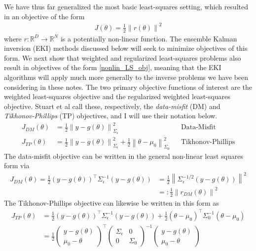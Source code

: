 \documentclass[12pt]{article}
\newcommand*{\norm}[1]{\left\lVert#1\right\rVert}
\newcommand{\R}{\mathbb{R}}
\begin{document}
We have thus far generalized the most basic least-squares setting, which resulted in an objective of the form
\begin{align}
J(\theta) = \frac{1}{2} \norm{r(\theta)}^2 \label{nonlin_LS_obj}
\end{align}
where $r: \R^D \to \R^N$ is a potentially non-linear function. The ensemble Kalman inversion (EKI) methods discussed below will seek to minimize objectives of this form. 
We next show that weighted and regularized least-squares problems also result in objectives of the form \ref{nonlin_LS_obj}, meaning that the EKI algorithms will apply much more 
generally to the inverse problems we have been considering in these notes. The two primary objective functions of interest are the weighted least-squares objective and the regularized 
weighted least-squares objective. Stuart et al call these, respectively, the \textit{data-misfit} (DM) and \textit{Tikhonov-Phillips} (TP) objectives, and I will use their notation below. 
\begin{align}
J_{DM}(\theta) &= \frac{1}{2} \norm{y - g(\theta)}^2_{\Sigma_{\epsilon}} && \text{Data-Misfit} \\
J_{TP}(\theta) &= \frac{1}{2} \norm{y - g(\theta)}^2_{\Sigma_{\epsilon}} + \frac{1}{2} \norm{\theta - \mu_0}^2_{\Sigma_0} && \text{Tikhonov-Phillips} 
\end{align}
The data-misfit objective can be written in the general non-linear least squares form via
\begin{align*}
J_{DM}(\theta) = \frac{1}{2} (y - g(\theta))^\top \Sigma^{-1}_{\epsilon} (y - g(\theta)) &= \frac{1}{2} \norm{\Sigma_{\epsilon}^{-1/2}(y - g(\theta))}^2 \\
																						&=: \frac{1}{2} \norm{r_{DM}(\theta)}^2
\end{align*}
The Tikhonov-Phillips objective can likewise be written in this form as
\begin{align*}
J_{TP}(\theta) &= \frac{1}{2} (y - g(\theta))^\top \Sigma^{-1}_{\epsilon} (y - g(\theta)) + \frac{1}{2} (\theta - \mu_0)^\top \Sigma^{-1}_0 (\theta - \mu_0) \\
		       &= \frac{1}{2} \begin{pmatrix} y - g(\theta) \\ \mu_0 - \theta \end{pmatrix}^\top \begin{pmatrix} \Sigma_{\epsilon} & 0 \\ 0 & \Sigma_0 \end{pmatrix}^{-1} \begin{pmatrix} y - g(\theta) \\ \mu_0 - \theta \end{pmatrix}
\end{align*}
\end{document}
